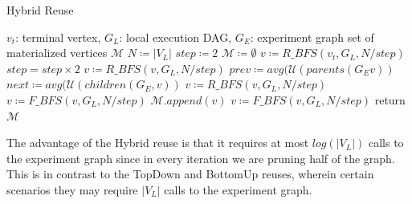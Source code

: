 \begin{algorithm}[h]
\caption{Hybrid Reuse}\label{algorithm-hybrid}
\begin{algorithmic}[1]
\Require $v_t$: terminal vertex, $G_L$: local execution DAG, $G_E$: experiment graph
\Ensure set of materialized vertices $\mathcal{M}$ 
\State $N \coloneqq |V_L|$
\State $step \coloneqq 2$
\State $\mathcal{M} \coloneqq \emptyset$
\State $v \coloneqq R\_BFS(v_t, G_L, N/step)$
		\State $step = step \times 2$
				\State $v \coloneqq R\_BFS(v, G_L, N/step)$
				\State $prev \coloneqq avg (\mathcal{U}(parents(G_E v))$
				\State $next \coloneqq avg (\mathcal{U}(children(G_E, v))$
						 \State $v \coloneqq R\_BFS(v, G_L, N/step)$
				\Else
					\State $v \coloneqq F\_BFS(v, G_L, N/step)$
				\EndIf
				\State $\mathcal{M}.append(v)$
				\State $v \coloneqq F\_BFS(v, G_L, N/step)$
		\EndIf
\EndWhile
\State return $\mathcal{M}$
\end{algorithmic}
\end{algorithm}
The advantage of the Hybrid reuse is that it requires at most $log(|V_L|)$ calls to the experiment graph since in every iteration we are pruning half of the graph.
This is in contrast to the TopDown and BottomUp reuses, wherein certain scenarios they may require $|V_L|$ calls to the experiment graph.